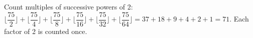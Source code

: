 Count multiples of successive powers of 2: $\lfloor\dfrac{75}{2}\rfloor+\lfloor\dfrac{75}{4}\rfloor+\lfloor\dfrac{75}{8}\rfloor+\lfloor\dfrac{75}{16}\rfloor+\lfloor\dfrac{75}{32}\rfloor+\lfloor\dfrac{75}{64}\rfloor=37+18+9+4+2+1=\boxed{71}$. Each factor of 2 is counted once.
